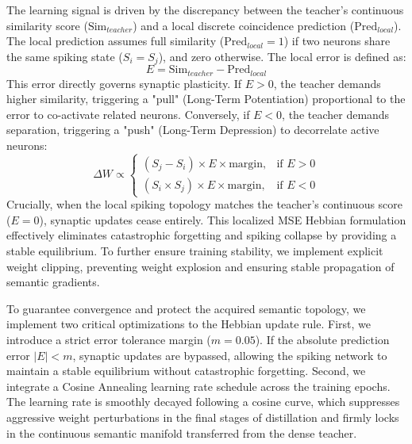 \documentclass{article} %
\begin{document}
The learning signal is driven by the discrepancy between the teacher's continuous similarity score ($\text{Sim}_{teacher}$) and a local discrete coincidence prediction ($\text{Pred}_{local}$). The local prediction assumes full similarity ($\text{Pred}_{local} = 1$) if two neurons share the same spiking state ($S_i = S_j$), and zero otherwise. The local error is defined as:
\begin{equation}
E = \text{Sim}_{teacher} - \text{Pred}_{local}
\end{equation}
This error directly governs synaptic plasticity. If $E > 0$, the teacher demands higher similarity, triggering a "pull" (Long-Term Potentiation) proportional to the error to co-activate related neurons. Conversely, if $E < 0$, the teacher demands separation, triggering a "push" (Long-Term Depression) to decorrelate active neurons:
\begin{equation}
\Delta W \propto 
\begin{cases} 
(S_j - S_i) \times E \times \text{margin}, & \text{if } E > 0 \\
(S_i \times S_j) \times E \times \text{margin}, & \text{if } E < 0 
\end{cases}
\end{equation}
Crucially, when the local spiking topology matches the teacher's continuous score ($E = 0$), synaptic updates cease entirely. This localized MSE Hebbian formulation effectively eliminates catastrophic forgetting and spiking collapse by providing a stable equilibrium. To further ensure training stability, we implement explicit weight clipping, preventing weight explosion and ensuring stable propagation of semantic gradients.

To guarantee convergence and protect the acquired semantic topology, we implement two critical optimizations to the Hebbian update rule. First, we introduce a strict error tolerance margin ($m=0.05$). If the absolute prediction error $|E| < m$, synaptic updates are bypassed, allowing the spiking network to maintain a stable equilibrium without catastrophic forgetting. Second, we integrate a Cosine Annealing learning rate schedule across the training epochs. The learning rate is smoothly decayed following a cosine curve, which suppresses aggressive weight perturbations in the final stages of distillation and firmly locks in the continuous semantic manifold transferred from the dense teacher.
\end{document}
